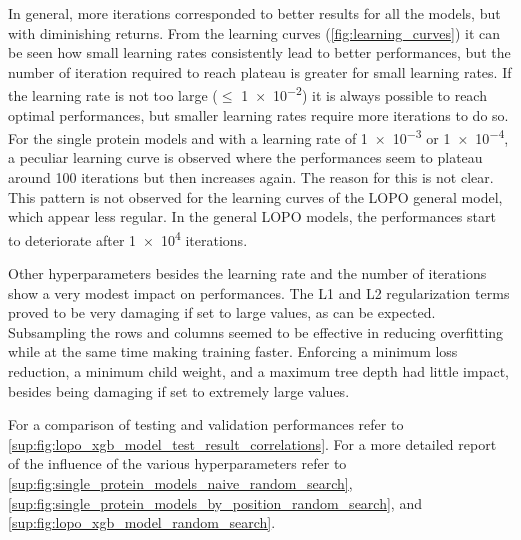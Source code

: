In general, more iterations corresponded to better results for all the models, but with diminishing returns.
From the learning curves (\autoref{fig:learning_curves}) it can be seen how small learning rates consistently lead to better performances, but the number of iteration required to reach plateau is greater for small learning rates.
If the learning rate is not too large ($\leq$ \num{1e-2}) it is always possible to reach optimal performances, but smaller learning rates require more iterations to do so.
For the single protein models and with a learning rate of \num{1e-3} or \num{1e-4}, a peculiar learning curve is observed where the performances seem to plateau around \num{100} iterations but then increases again.
The reason for this is not clear.
This pattern is not observed for the learning curves of the LOPO general model, which appear less regular.
In the general LOPO models, the performances start to deteriorate after \num{1e4} iterations.

Other hyperparameters besides the learning rate and the number of iterations show a very modest impact on performances.
The L1 and L2 regularization terms proved to be very damaging if set to large values, as can be expected.
Subsampling the rows and columns seemed to be effective in reducing overfitting while at the same time making training faster.
Enforcing a minimum loss reduction, a minimum child weight, and a maximum tree depth had little impact, besides being damaging if set to extremely large values.

For a comparison of testing and validation performances refer to \autoref{sup:fig:lopo_xgb_model_test_result_correlations}.
For a more detailed report of the influence of the various hyperparameters refer to \autoref{sup:fig:single_protein_models_naive_random_search}, \autoref{sup:fig:single_protein_models_by_position_random_search}, and \autoref{sup:fig:lopo_xgb_model_random_search}.

\begin{figure}[t]
\end{figure}

